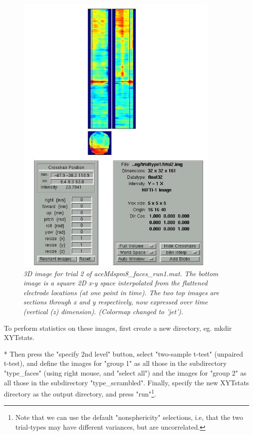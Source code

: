 \begin{figure}
\begin{center}
\includegraphics[width=100mm]{multimodal/figures/figure_32_6}
\caption{\em  3D image for trial 2 of aceMdspm8_faces_run1.mat. The bottom image is a square 2D x-y space interpolated from the flattened electrode locations (at one point in time). The two top images are sections through x and y respectively, now expressed over time (vertical (z) dimension). (Colormap changed to 'jet').\label{fig_32_6}}
\end{center}
\end{figure}

To perform statistics on these images, first create a new directory, eg. mkdir XYTstats.

* Then press the "specify 2nd level" button,  select "two-sample t-test" (unpaired t-test), and define the images for "group 1" as all those in the subdirectory "type_faces" (using right mouse, and "select all") and the images for "group 2" as all those in the subdirectory "type_scrambled". Finally, specify the new XYTstats directory as the output directory, and press "run"\footnote{Note that we can use the default "nonsphericity" selections, i.e, that the two trial-types may have different variances, but are uncorrelated.}.



